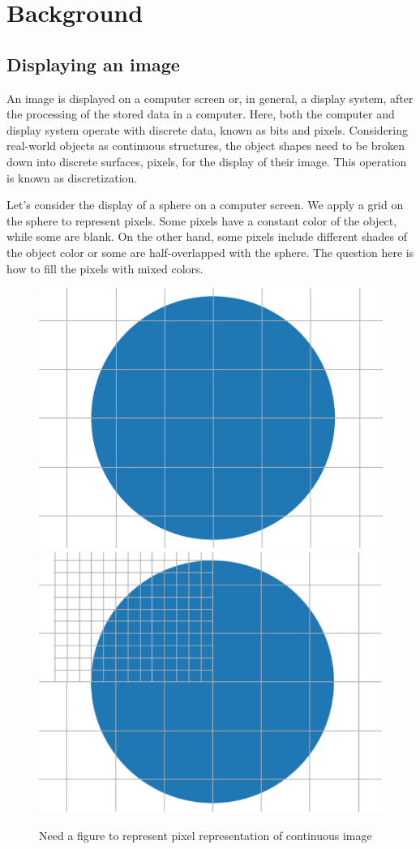 \chapter{Background}


\section{Displaying an image}
An image is displayed on a computer screen or, in general, a display system, after the processing of the stored data in a computer. Here, both the computer and display system operate with discrete data, known as bits and pixels. Considering real-world objects as continuous structures, the object shapes need to be broken down into discrete surfaces, pixels, for the display of their image. This operation is known as discretization. 

Let's consider the display of a sphere on a computer screen. We apply a grid on the sphere to represent pixels. Some pixels have a constant color of the object, while some are blank. On the other hand, some pixels include different shades of the object color or some are half-overlapped with the sphere. The question here is how to fill the pixels with mixed colors. 

\begin{figure}
  \centering
   \includegraphics[width=0.4\linewidth]{Images/grid_circle.png}
    \includegraphics[width=0.4\linewidth]{Images/merged_grid_circle2-crop.pdf}

   \caption{Need a figure to represent pixel representation of continuous image}
   \label{fig:display-grid}
\end{figure}



